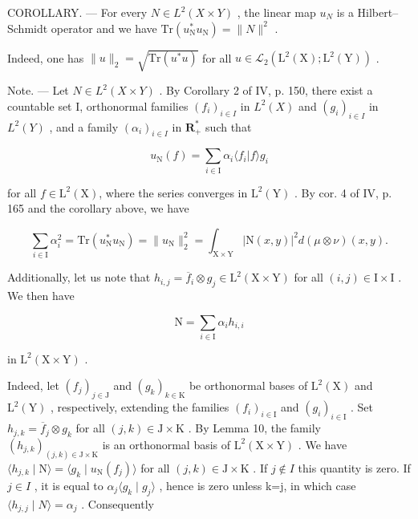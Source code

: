 COROLLARY. --- For every \(N \in L^{2}(X \times Y)\) , the linear map \(u_{N}\) is a Hilbert--Schmidt operator and we have \(\mathrm{Tr}(u_{\mathrm{N}}^{*}u_{\mathrm{N}}) = \|N\|^{2}\) .

Indeed, one has \(\| u\| _2 = \sqrt{\mathrm{Tr}(u^*u)}\) for all \(u\in \mathcal{L}_2(\mathrm{L}^2 (\mathrm{X});\mathrm{L}^2 (\mathrm{Y}))\) .

Note. --- Let \(N \in L^{2}(X \times Y)\) . By Corollary 2 of IV, p. 150, there exist a countable set I, orthonormal families \((f_{i})_{i \in I}\) in \(L^{2}(X)\) and \((g_{i})_{i \in I}\) in \(L^{2}(Y)\) , and a family \((\alpha_{i})_{i \in I}\) in \(\mathbf{R}_{+}^{*}\) such that

\[
u _ {\mathrm{N}} (f) = \sum_ {i \in \mathrm{I}} \alpha_ {i} \langle f _ {i} | f \rangle g _ {i}
\]

for all \(f \in \mathrm{L}^2(\mathrm{X})\), where the series converges in \(\mathrm{L}^2(\mathrm{Y})\) . By cor. 4 of IV, p. 165 and the corollary above, we have

\[
\sum_ {i \in \mathrm{I}} \alpha_ {i} ^ {2} = \mathrm{Tr} (u _ {\mathrm{N}} ^ {*} u _ {\mathrm{N}}) = \| u _ {\mathrm{N}} \| _ {2} ^ {2} = \int_ {\mathrm{X} \times \mathrm{Y}} | \mathrm{N} (x, y) | ^ {2} d (\mu \otimes \nu) (x, y).
\]

Additionally, let us note that \(h_{i,j} = \overline{f}_{i} \otimes g_{j} \in \mathrm{L}^{2}(\mathrm{X} \times \mathrm{Y})\) for all \((i, j) \in \mathrm{I} \times \mathrm{I}\) . We then have

\[
\mathrm{N} = \sum_ {i \in \mathrm{I}} \alpha_ {i} h _ {i, i}
\]

in \(\mathrm{L}^2 (\mathrm{X}\times \mathrm{Y})\) .

Indeed, let \((f_{j})_{j\in\mathrm{J}}\) and \((g_{k})_{k\in\mathrm{K}}\) be orthonormal bases of \(\mathrm{L}^{2}(\mathrm{X})\) and \(\mathrm{L}^{2}(\mathrm{Y})\) , respectively, extending the families \((f_{i})_{i\in\mathrm{I}}\) and \((g_{i})_{i\in\mathrm{I}}\) . Set \(h_{j,k}=\overline{f}_{j}\otimes g_{k}\) for all \((j,k)\in\mathrm{J}\times\mathrm{K}\) . By Lemma 10, the family \((h_{j,k})_{(j,k)\in\mathrm{J}\times\mathrm{K}}\) is an orthonormal basis of \(\mathrm{L}^{2}(\mathrm{X}\times\mathrm{Y})\) . We have \(\langle h_{j,k}\mid\mathrm{N}\rangle=\langle g_{k}\mid u_{\mathrm{N}}(f_{j})\rangle\) for all \((j,k)\in\mathrm{J}\times\mathrm{K}\) . If \(j\notin I\) this quantity is zero. If \(j\in I\) , it is equal to \(\alpha_{j}\langle g_{k}\mid g_{j}\rangle\) , hence is zero unless k=j, in which case \(\langle h_{j,j}\mid N\rangle=\alpha_{j}\) . Consequently

